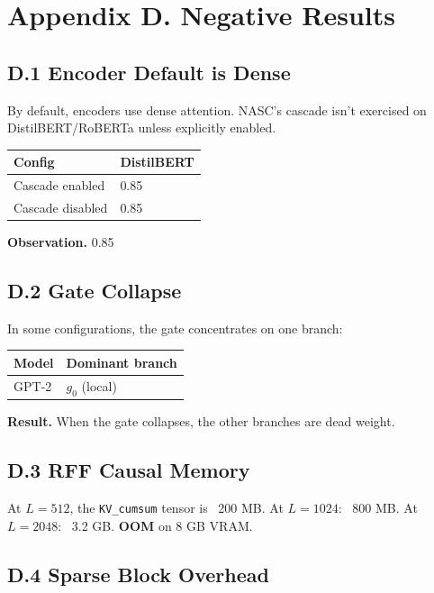 
\section{Appendix D. Negative Results}

\subsection{D.1 Encoder Default is Dense}

By default, encoders use dense attention. NASC's cascade isn't exercised 
on DistilBERT/RoBERTa unless explicitly enabled.

\begin{table}[H]
\centering
\small
\begin{tabular}{ll}
\toprule
\textbf{Config} & \textbf{DistilBERT} \\
\midrule
Cascade enabled & 0.85 \\
Cascade disabled & 0.85 \\
\bottomrule
\end{tabular}
\end{table}

\textbf{Observation.} 0.85

\subsection{D.2 Gate Collapse}

In some configurations, the gate concentrates on one branch:

\begin{table}[H]
\centering
\small
\begin{tabular}{ll}
\toprule
\textbf{Model} & \textbf{Dominant branch} \\
\midrule
GPT-2 & $g_0$ (local) \\
\bottomrule
\end{tabular}
\end{table}

\textbf{Result.} When the gate collapses, the other branches are dead weight.

\subsection{D.3 RFF Causal Memory}

At $L = 512$, the \texttt{KV\_cumsum} tensor is ~200 MB. At $L = 1024$: ~800 MB. 
At $L = 2048$: ~3.2 GB. \textbf{OOM} on 8 GB VRAM.

\subsection{D.4 Sparse Block Overhead}

